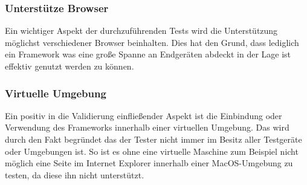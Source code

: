 	\subsubsection{Unterstütze Browser}
	Ein wichtiger Aspekt der durchzuführenden Tests wird die Unterstützung möglichst verschiedener Browser beinhalten. Dies hat 	den Grund, dass lediglich ein Framework was eine große Spanne an Endgeräten abdeckt in der Lage ist effektiv genutzt werden 	zu können.

	\subsubsection{Virtuelle Umgebung}
	Ein positiv in die Validierung einfließender Aspekt ist die Einbindung oder Verwendung des Frameworks innerhalb einer 			virtuellen Umgebung. Das wird durch den Fakt begründet das der Tester nicht immer im Besitz aller Testgeräte oder 				Umgebungen ist. So ist es ohne eine virtuelle Maschine zum Beispiel nicht möglich eine Seite im Internet Explorer innerhalb 		einer MacOS-Umgebung zu testen, da diese ihn nicht unterstützt.

